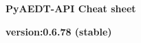 \documentclass[9pt,landscape]{article}
\begin{document}
\footnotesize
\justifying
\begin{center}
     \Huge{\textbf{PyAEDT-API Cheat sheet}} \\
\end{center}
\begin{center}
\small{\textbf{version:0.6.78 (stable)}} \\
\end{center}
\vspace{-0.15cm}
\noindent\makebox[\linewidth]{\rule{\paperwidth}{2pt}}
\end{document}
